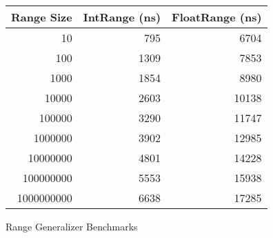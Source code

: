 \begin{figure}[H]
    \centering
    \footnotesize
    \begin{tabular}{r r r}
        \toprule
        \textbf{Range Size}      & \textbf{IntRange (ns)}      & \textbf{FloatRange (ns)} \\
        \midrule
        10              & 795   & 6704  \\
        100	            & 1309  & 7853  \\
        1000            & 1854  & 8980  \\
        10000	        & 2603	& 10138 \\
        100000	        & 3290	& 11747 \\
        1000000	        & 3902	& 12985 \\
        10000000	    & 4801	& 14228 \\
        100000000	    & 5553	& 15938 \\
        1000000000	    & 6638	& 17285 \\
        \bottomrule
    \end{tabular}
    \caption{Range Generalizer Benchmarks}
\end{figure}
